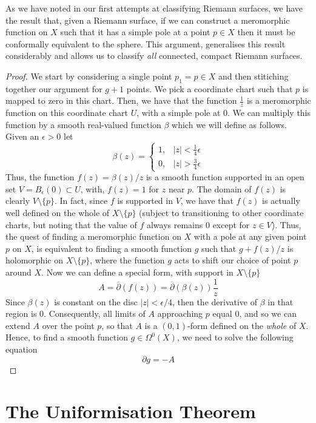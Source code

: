 \documentclass[11pt]{report}
\theoremstyle{definition}
\begin{document}
As we have noted in our first attempts at classifying Riemann surfaces, we have the result that, given a Riemann surface, if we can construct a meromorphic function on $X$ such that it has a simple pole at a point $p \in X$ then it must be conformally equivalent to the sphere. This argument, generalises this result considerably and allows us to classify \emph{all} connected, compact Riemann surfaces.
\begin{proof}
  We start by considering a single point $p_1=p \in X$ and then stitiching together our argument for $g+1$ points. We pick a coordinate chart such that $p$ is mapped to zero in this chart. Then, we have that the function $\frac{1}{z}$ is a meromorphic function on this coordinate chart $U$, with a simple pole at $0$. We can multiply this function by a smooth real-valued function $\beta$ which we will define as follows. Given an $\epsilon > 0$ let 
  \[
    \beta(z) = 
    \begin{cases}
      1 , & |z|<\frac{1}{4}\epsilon \\
      0 , & |z|>\frac{3}{4}\epsilon
    \end{cases}
  \]
  Thus, the function $f(z)=\beta(z)/z$ is a smooth function supported in an open set $V=B_{\epsilon}(0)\subset U$, with, $f(z) = 1$ for $z$ near $p$. The domain of $f(z)$ is clearly $V\setminus \{p\}$. In fact, since $f$ is supported in $V$, we have that $f(z)$ is actually well defined on the whole of $X\setminus \{p\}$ (subject to transitioning to other coordinate charts, but noting that the value of $f$ always remains $0$ except for $z\in V$). Thus, the quest of finding a meromorphic function on $X$ with a pole at any given point $p$ on $X$, is equivalent to finding a smooth function $g$ such that $g + f(z)/z$ is holomorphic on $X \setminus \{p\}$, where the function $g$ acts to shift our choice of point $p$ around $X$.
  Now we can define a special form, with support in $X\setminus \{p\}$
  \[A = \overline{\partial}(f(z))=\overline{\partial}(\beta(z))\frac{1}{z} \]
  Since $\beta(z)$ is constant on the disc $|z| < \epsilon/4$, then the derivative of $\beta$ in that region is 0. Consequently, all limits of $A$ approaching $p$ equal $0$, and so we can extend $A$ over the point $p$, so that $A$ is a $(0,1)$-form defined on the \emph{whole} of $X$. Hence, to find a smooth function $g\in \Omega^0(X)$, we need to solve the following equation
  \[\partial g = -A\]
  
\end{proof}
\section{The Uniformisation Theorem}
\end{document}
